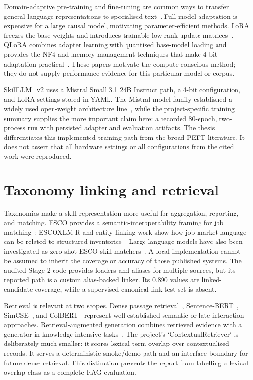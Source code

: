 Domain-adaptive pre-training and fine-tuning are common ways to transfer general language representations to specialised text~\cite{gururangan2020dontstop,howard2018ulmfit}. Full model adaptation is expensive for a large causal model, motivating parameter-efficient methods. LoRA freezes the base weights and introduces trainable low-rank update matrices~\cite{hu2022lora}. QLoRA combines adapter learning with quantized base-model loading and provides the NF4 and memory-management techniques that make 4-bit adaptation practical~\cite{dettmers2023qlora}. These papers motivate the compute-conscious method; they do not supply performance evidence for this particular model or corpus.

SkillLLM\_v2 uses a Mistral Small 3.1 24B Instruct path, a 4-bit configuration, and LoRA settings stored in YAML. The Mistral model family established a widely used open-weight architecture line~\cite{jiang2023mistral}, while the project-specific training summary supplies the more important claim here: a recorded 80-epoch, two-process run with persisted adapter and evaluation artifacts. The thesis differentiates this implemented training path from the broad PEFT literature. It does not assert that all hardware settings or all configurations from the cited work were reproduced.

\section{Taxonomy linking and retrieval}

Taxonomies make a skill representation more useful for aggregation, reporting, and matching. ESCO provides a semantic-interoperability framing for job matching~\cite{levrang2014esco}; ESCOXLM-R and entity-linking work show how job-market language can be related to structured inventories~\cite{zhang2023escoxlmr,zhang2024entitylinking}. Large language models have also been investigated as zero-shot ESCO skill matchers~\cite{clavie2023batteries}. A local implementation cannot be assumed to inherit the coverage or accuracy of those published systems. The audited Stage-2 code provides loaders and aliases for multiple sources, but its reported path is a custom alias-backed linker. Its 0.890 values are linked-candidate coverage, while a supervised canonical-link test set is absent.

Retrieval is relevant at two scopes. Dense passage retrieval~\cite{karpukhin2020dpr}, Sentence-BERT~\cite{reimers2019sentencebert}, SimCSE~\cite{gao2021simcse}, and ColBERT~\cite{khattab2020colbert} represent well-established semantic or late-interaction approaches. Retrieval-augmented generation combines retrieved evidence with a generator in knowledge-intensive tasks~\cite{lewis2020rag}. The project's `ContextualRetriever` is deliberately much smaller: it scores lexical term overlap over contextualised records. It serves a deterministic smoke/demo path and an interface boundary for future dense retrieval. This distinction prevents the report from labelling a lexical overlap class as a complete RAG evaluation.

